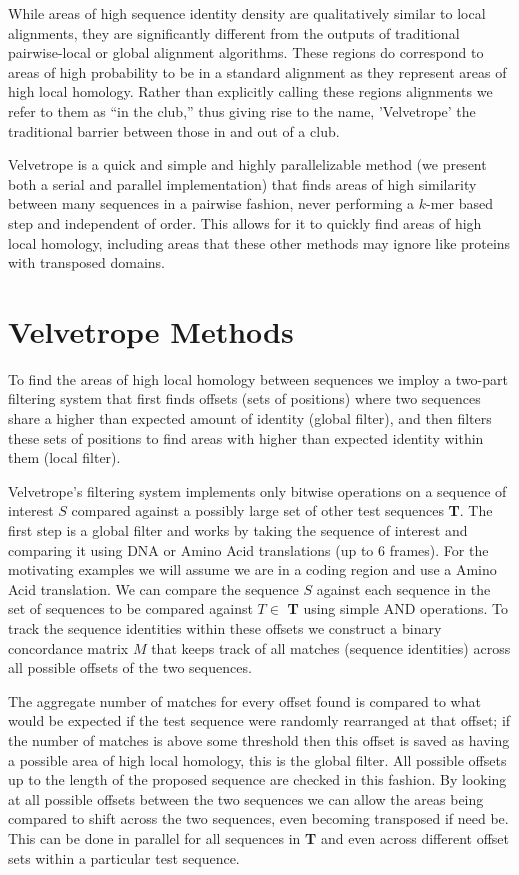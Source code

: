 \documentclass[phd,tocprelim]{cornell}
\begin{document}
While areas of high sequence identity density are qualitatively similar to local alignments, they are significantly different from the outputs of traditional pairwise-local or global alignment algorithms. These regions do correspond to areas of high probability to be in a standard alignment as they represent areas of high local homology. Rather than explicitly calling these regions alignments we refer to them as ``in the club,'' thus giving rise to the name, 'Velvetrope' the traditional barrier between those in and out of a club.

Velvetrope is a quick and simple and highly parallelizable method (we present both a serial and parallel implementation)
that finds areas of high similarity between many
sequences in a pairwise fashion, never performing a $k$-mer based step and independent of order. This allows for it
to quickly find areas of high local homology, including areas that these other
methods may ignore like proteins with transposed domains.


\chapter{Velvetrope Methods} %
\label{cha:Velvetrope Methods}

To find the areas of high local homology between sequences we imploy a two-part filtering system that first finds offsets (sets of positions) where two sequences share a higher than expected amount of identity (global filter), and then filters these sets of positions to find areas with higher than expected identity within them (local filter).

Velvetrope's filtering system implements only bitwise operations on a sequence of interest $S$ compared against a possibly large set of other test sequences \textbf{T}. The first step is a global filter and works by taking the sequence of interest and comparing it using DNA or Amino Acid translations (up to 6 frames). For the motivating examples we will assume we are in a coding region and use a Amino Acid translation. We can compare the sequence $S$ against each sequence in the set of sequences to be compared against $T \in$ \textbf{T}  using simple AND operations. To track the sequence identities within these offsets we construct a binary concordance matrix $M$ that keeps track of all matches (sequence identities) across all possible offsets of the two sequences.

The aggregate number of matches for every offset found is compared to what would be expected if the test sequence were randomly rearranged at that offset; if the number of matches is above some threshold then this offset is saved as having a possible area of high local homology, this is the global filter. All possible offsets up to the length of the proposed sequence are checked in this fashion. By looking at all possible offsets between the two sequences we can allow the areas being compared to shift across the two sequences, even becoming transposed if need be. This can be done in parallel for all sequences in \textbf{T} and even across different offset sets within a particular test sequence.
\end{document}

